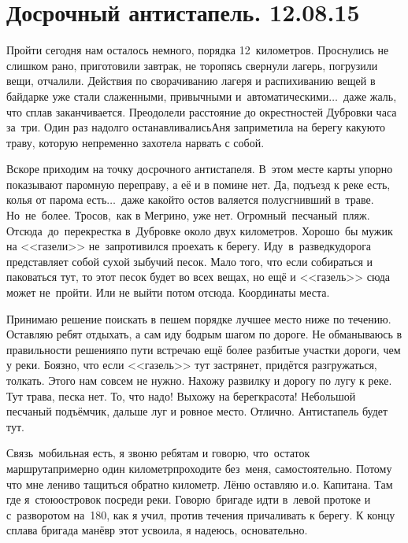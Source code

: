 \chapter{Досрочный антистапель. 12.08.15}

Пройти сегодня нам осталось немного, порядка 12~километров. Проснулись не слишком рано, приготовили завтрак, не торопясь свернули лагерь, погрузили вещи, отчалили. Действия по сворачиванию лагеря и распихиванию вещей в байдарке уже стали слаженными, привычными и~автоматическими$\ldots$~даже жаль, что сплав заканчивается. Преодолели расстояние до окрестностей Дубровки часа за~три. Один раз надолго останавливались\mdash Аня заприметила на берегу какую\sdash то траву, которую непременно захотела нарвать с собой. 

Вскоре приходим на точку досрочного антистапеля. В~этом месте карты упорно показывают паромную переправу, а её и в помине нет. Да, подъезд к реке есть, колья от парома есть$\ldots$~даже какой\sdash то остов валяется полусгнивший в~траве. Но~не~более. Тросов,~как в Мегрино, уже нет. Огромный~песчаный~пляж. Отсюда~до~перекрестка в~Дубровке около двух километров. Хорошо~бы мужик на <<газели>> не~запротивился проехать к берегу. Иду~в~разведку\mdash дорога представляет собой сухой зыбучий песок. Мало того, что если собираться и паковаться тут, то этот песок будет во всех вещах, но ещё и <<газель>> сюда может не~пройти. Или не выйти потом отсюда. Координаты места\mdash \CoordsChagodoschaZagrivieParom.

Принимаю решение поискать в пешем порядке лучшее место ниже по течению. Оставляю ребят отдыхать, а сам иду бодрым шагом по дороге. Не обманываюсь в правильности решения\mdash по пути встречаю ещё более разбитые участки дороги, чем у реки. Боязно, что если <<газель>> тут застрянет, придётся разгружаться, толкать. Этого нам совсем не нужно. Нахожу развилку и дорогу по лугу к реке. Тут трава, песка нет. То, что надо! Выхожу на берег\mdash красота! Небольшой песчаный подъёмчик, дальше луг и ровное место. Отлично. Антистапель будет тут\mdash \CoordsChagodoschaFifteenAntistapel. 

Связь~мобильная есть, я звоню ребятам и говорю, что~остаток маршрута\mdash примерно один километр\mdash проходите без~меня, самостоятельно. Потому что мне лениво тащиться обратно километр. Лёню оставляю и.о. Капитана. Там где я~стою\mdash островок посреди реки. Говорю~бригаде идти в~левой протоке и с~разворотом на~180\degree, как я учил, против течения причаливать к берегу. К концу сплава бригада манёвр этот усвоила, я надеюсь, основательно. 

